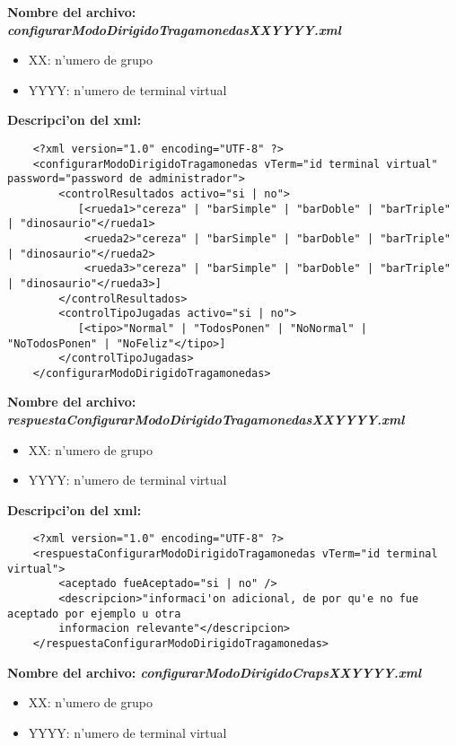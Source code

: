 \bf{Nombre del archivo:} \it{configurarModoDirigidoTragamonedasXXYYYY.xml}
\begin{itemize}
    \item{XX: n'umero de grupo}
    \item{YYYY: n'umero de terminal virtual}
\end{itemize}

\bf{Descripci'on del xml:}
\begin{verbatim}
    <?xml version="1.0" encoding="UTF-8" ?>
    <configurarModoDirigidoTragamonedas vTerm="id terminal virtual" password="password de administrador">
        <controlResultados activo="si | no">
           [<rueda1>"cereza" | "barSimple" | "barDoble" | "barTriple" | "dinosaurio"</rueda1>
            <rueda2>"cereza" | "barSimple" | "barDoble" | "barTriple" | "dinosaurio"</rueda2>
            <rueda3>"cereza" | "barSimple" | "barDoble" | "barTriple" | "dinosaurio"</rueda3>]
        </controlResultados>
        <controlTipoJugadas activo="si | no">
           [<tipo>"Normal" | "TodosPonen" | "NoNormal" | "NoTodosPonen" | "NoFeliz"</tipo>]
        </controlTipoJugadas>
    </configurarModoDirigidoTragamonedas>
\end{verbatim}


\bf{Nombre del archivo:} \it{respuestaConfigurarModoDirigidoTragamonedasXXYYYY.xml}
\begin{itemize}
    \item{XX: n'umero de grupo}
    \item{YYYY: n'umero de terminal virtual}
\end{itemize}

\bf{Descripci'on del xml:}
\begin{verbatim}
    <?xml version="1.0" encoding="UTF-8" ?>
    <respuestaConfigurarModoDirigidoTragamonedas vTerm="id terminal virtual">
        <aceptado fueAceptado="si | no" />
        <descripcion>"informaci'on adicional, de por qu'e no fue aceptado por ejemplo u otra
        informacion relevante"</descripcion>
    </respuestaConfigurarModoDirigidoTragamonedas>
\end{verbatim}


\bf{Nombre del archivo:} \it{configurarModoDirigidoCrapsXXYYYY.xml}
\begin{itemize}
    \item{XX: n'umero de grupo}
    \item{YYYY: n'umero de terminal virtual}
\end{itemize}

